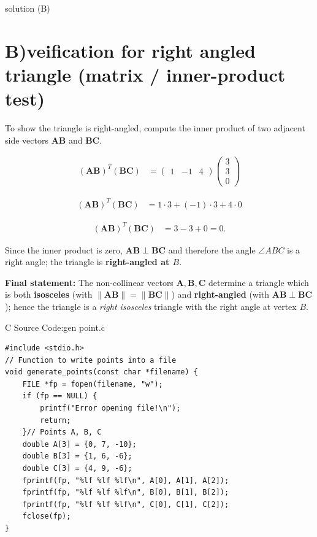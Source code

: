 \documentclass{beamer}
\numberwithin{equation}{section}
\theoremstyle{remark}
\newcommand{\myvec}[1]{\ensuremath{\begin{pmatrix}#1\end{pmatrix}}}
\let\vec\mathbf
\begin{document}
\begin{frame}{solution (B)}

\section* {B)veification for right angled triangle (matrix / inner-product test)}
To show the triangle is right-angled, compute the inner product of two adjacent side vectors $\vec{AB}$ and $\vec{BC}$.
\

    


\begin{align}
(\vec{AB})^T(\vec{BC}) &= \myvec{1&-1&4}\myvec{3\\3\\0}
\end{align}

\begin{align}
(\vec{AB})^T(\vec{BC}) &= 1\cdot 3 + (-1)\cdot 3 + 4\cdot 0
\end{align}

\begin{align}
(\vec{AB})^T(\vec{BC}) &= 3 - 3 + 0 = 0.
\end{align}

Since the inner product is zero, $\vec{AB}\perp\vec{BC}$ and therefore the angle $\angle ABC$ is a right angle; the triangle is \textbf{right-angled at $B$}.



\noindent\textbf{Final statement:} The non-collinear vectors $\vec{A},\vec{B},\vec{C}$ determine a triangle which is both \textbf{isosceles} (with $\|\vec{AB}\|=\|\vec{BC}\|$) and \textbf{right-angled} (with $\vec{AB}\perp\vec{BC}$); hence the triangle is a \emph{right isosceles} triangle with the right angle at vertex $B$.
\end{frame}
\begin{frame}[fragile]{C Source Code:gen point.c}
\begin{verbatim}
#include <stdio.h>
// Function to write points into a file
void generate_points(const char *filename) {
    FILE *fp = fopen(filename, "w");
    if (fp == NULL) {
        printf("Error opening file!\n");
        return;
    }// Points A, B, C
    double A[3] = {0, 7, -10};
    double B[3] = {1, 6, -6};
    double C[3] = {4, 9, -6};
    fprintf(fp, "%lf %lf %lf\n", A[0], A[1], A[2]);
    fprintf(fp, "%lf %lf %lf\n", B[0], B[1], B[2]);
    fprintf(fp, "%lf %lf %lf\n", C[0], C[1], C[2]);
    fclose(fp);
}
\end{verbatim}
\end{frame}
\end{document}
